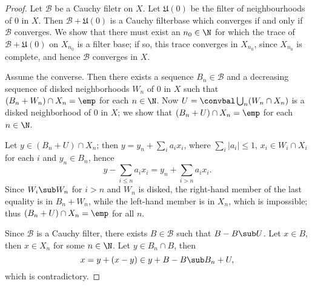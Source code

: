 \begin{proof}
Let $\mathcal{B}$ be a Cauchy filetr on $X$. Let $\mathfrak{U}(0)$ be the filter of neighbourhoods of $0$ in $X$. Then $\mathcal{B}+\mathfrak{U}(0)$ is a Cauchy filterbase which converges if and only if $\mathcal{B}$ converges. We show that there must exist an $n_0\in\N$ for which the trace of $\mathcal{B}+\mathfrak{U}(0)$ on $X_{n_0}$ is a filter base; if so, this trace converges in $X_{n_0}$, since $X_{n_0}$ is complete, and hence $\mathcal{B}$ converges in $X$.\par
Assume the converse. Then there exists a sequence $B_n\in\mathcal{B}$ and a decreasing sequence of disked neighborhoods $W_n$ of $0$ in $X$ such that $(B_n+W_n)\cap X_n=\emp$ for each $n\in\N$. Now $U=\convbal\bigcup_n(W_n\cap X_n)$ is a disked neighborhood of $0$ in $X$; we show that $(B_n+U)\cap X_n=\emp$ for each $n\in\N$.\par
Let $y\in(B_n+U)\cap X_n$; then $y=y_n+\sum_ia_ix_i$, where $\sum_i|a_i|\leq 1$, $x_i\in W_i\cap X_i$ for each $i$ and $y_n\in B_n$, hence
\[y-\sum_{i\leq n}a_ix_i=y_n+\sum_{i>n}a_ix_i.\]
Since $W_i\sub W_n$ for $i>n$ and $W_n$ is disked, the right-hand member
of the last equality is in $B_n+W_n$, while the left-hand member is in $X_n$, which is impossible; thus $(B_n+U)\cap X_n=\emp$ for all $n$.\par
Since $\mathcal{B}$ is a Cauchy filter, there exists $B\in\mathcal{B}$ such that $B-B\sub U$. Let $x\in B$, then $x\in X_n$ for some $n\in\N$. Let $y\in B_n\cap B$, then
\[x=y+(x-y)\in y+B-B\sub B_n+U,\]
which is contradictory.
\end{proof}
